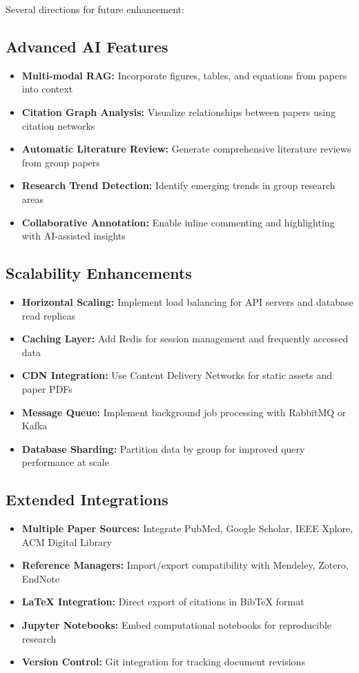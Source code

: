 \documentclass[12pt]{report}
\begin{document}
Several directions for future enhancement:

\subsection{Advanced AI Features}

\begin{itemize}
    \item \textbf{Multi-modal RAG:} Incorporate figures, tables, and equations from papers into context
    \item \textbf{Citation Graph Analysis:} Visualize relationships between papers using citation networks
    \item \textbf{Automatic Literature Review:} Generate comprehensive literature reviews from group papers
    \item \textbf{Research Trend Detection:} Identify emerging trends in group research areas
    \item \textbf{Collaborative Annotation:} Enable inline commenting and highlighting with AI-assisted insights
\end{itemize}

\subsection{Scalability Enhancements}

\begin{itemize}
    \item \textbf{Horizontal Scaling:} Implement load balancing for API servers and database read replicas
    \item \textbf{Caching Layer:} Add Redis for session management and frequently accessed data
    \item \textbf{CDN Integration:} Use Content Delivery Networks for static assets and paper PDFs
    \item \textbf{Message Queue:} Implement background job processing with RabbitMQ or Kafka
    \item \textbf{Database Sharding:} Partition data by group for improved query performance at scale
\end{itemize}

\subsection{Extended Integrations}

\begin{itemize}
    \item \textbf{Multiple Paper Sources:} Integrate PubMed, Google Scholar, IEEE Xplore, ACM Digital Library
    \item \textbf{Reference Managers:} Import/export compatibility with Mendeley, Zotero, EndNote
    \item \textbf{LaTeX Integration:} Direct export of citations in BibTeX format
    \item \textbf{Jupyter Notebooks:} Embed computational notebooks for reproducible research
    \item \textbf{Version Control:} Git integration for tracking document revisions
\end{itemize}
\end{document}

